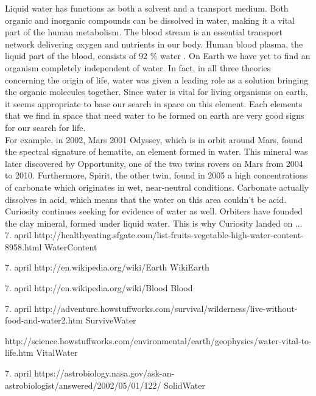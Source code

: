 Liquid water has functions as both a solvent and a transport medium. Both organic and inorganic compounds can be dissolved in water, making it a vital part of the human metabolism. The blood stream is an essential transport network delivering oxygen and nutrients in our body. Human blood plasma, the liquid part of the blood, consists of 92 \% water \cite{Blood}. On Earth we have yet to find an organism completely independent of water. In fact, in all three theories concerning the origin of life, water was given a leading role as a solution bringing the organic molecules together. Since water is vital for living organisms on earth, it seems appropriate to base our search in space on this element. Each elements that we find in space that need water to be formed on earth are very good signs for our search for life. \\
For example, in 2002, Mars 2001 Odyssey, which is in orbit around Mars, found the spectral signature of hematite, an element formed in water. This mineral was later discovered by Opportunity, one of the two twins rovers on Mars from 2004 to 2010.
Furthermore, Spirit, the other twin, found in 2005 a high concentrations of carbonate which originates in wet, near-neutral conditions. Carbonate actually dissolves in acid, which means that the water on this area couldn't be acid.\\
Curiosity continues seeking for evidence of water as well. Orbiters have founded the clay mineral, formed under liquid water. This is why Curiosity landed on ...\\


7. april http://healthyeating.sfgate.com/list-fruits-vegetable-high-water-content-8958.html WaterContent

7. april http://en.wikipedia.org/wiki/Earth WikiEarth

7. april http://en.wikipedia.org/wiki/Blood Blood

7. april http://adventure.howstuffworks.com/survival/wilderness/live-without-food-and-water2.htm SurviveWater

http://science.howstuffworks.com/environmental/earth/geophysics/water-vital-to-life.htm VitalWater

7. april https://astrobiology.nasa.gov/ask-an-astrobiologist/answered/2002/05/01/122/ SolidWater